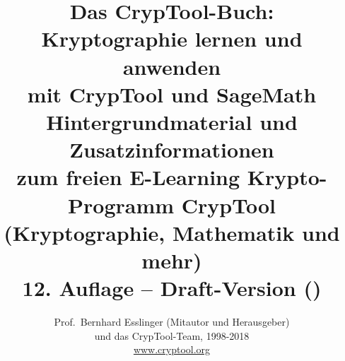 \title{%
	{\Huge Das CrypTool-Buch:\\[20pt]
	       {\bf Kryptographie lernen und anwenden\\[15pt]
                mit CrypTool und SageMath}} \\[35pt]
	{\LARGE Hintergrundmaterial und Zusatzinformationen\\
	 zum freien E-Learning Krypto-Programm CrypTool\\[5pt]
	 (Kryptographie, Mathematik und mehr)} \\[35pt]
	 {\large 12. Auflage --  {\bf Draft-Version} (\currenttime)}
}%

\author{%
	{\LARGE Prof.\ Bernhard Esslinger (Mitautor und Herausgeber)}\\[10pt]
	{\LARGE und das CrypTool-Team, 1998-2018}\\[10pt]
	\url{www.cryptool.org}
}%


\usepackage[colorlinks=true,linkcolor=blue,citecolor=blue,urlcolor=cyan, %
bookmarksnumbered=true,pdfpagelabels,plainpages=false,hyperfootnotes=false]{hyperref}




%

\VerbatimFootnotes
\renewcommand\footnoterule{
\vspace{2em}%
\hrule width .4\columnwidth
\vspace{4pt}
}%
\frontmatter %
\maketitle

